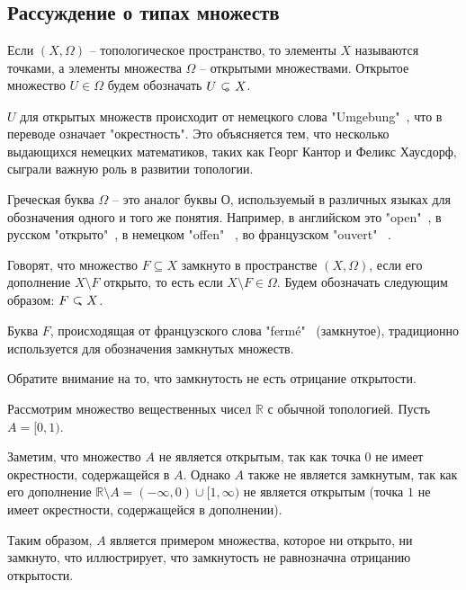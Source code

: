 \subsection{Рассуждение о типах множеств}

Если $(X, \Omega)$ -- топологическое пространство, то элементы $X$ называются точками, а элементы множества $\Omega$ -- открытыми множествами. Открытое множество $U \in \Omega$  будем обозначать $U \open X$.

\( U \) для открытых множеств происходит от немецкого слова "Umgebung"\ , что в переводе означает "окрестность". Это объясняется тем, что несколько выдающихся немецких математиков, таких как Георг Кантор и Феликс Хаусдорф, сыграли важную роль в развитии топологии. 


\begin{remark}
	Греческая буква \(\Omega\) -- это аналог буквы О, используемый в различных языках для обозначения одного и того же понятия. Например, в английском это "open"\ , в русском "открыто"\ , в немецком "offen" \ , во французском "ouvert" \ .
\end{remark}

\begin{definition}
	Говорят, что множество \(F \subseteq X\) замкнуто в пространстве \((X, \Omega)\), если его дополнение \(X \setminus F\) открыто, то есть если \(X \setminus F \in \Omega\). Будем обозначать следующим образом: $F \closed X$.
\end{definition}

Буква \( F \), происходящая от французского слова "fermé" \ (замкнутое), традиционно используется для обозначения замкнутых множеств. 


\begin{remark}
	Обратите внимание на то, что замкнутость не есть отрицание открытости.
\end{remark}

\begin{example}
Рассмотрим множество вещественных чисел $\mathbb{R}$ с обычной топологией. Пусть $A = [0, 1)$.  

Заметим, что множество $A$ не является открытым, так как точка $0$ не имеет окрестности, содержащейся в $A$. Однако $A$ также не является замкнутым, так как его дополнение $\mathbb{R} \setminus A = (-\infty, 0) \cup [1, \infty)$ не является открытым (точка $1$ не имеет окрестности, содержащейся в дополнении).  

Таким образом, $A$ является примером множества, которое ни открыто, ни замкнуто, что иллюстрирует, что замкнутость не равнозначна отрицанию открытости.

\end{example}

